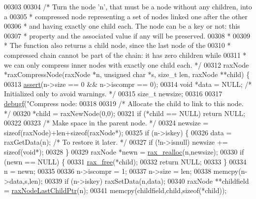 \begin{DoxyCode}
{00303 
00304 \textcolor{comment}{/* Turn the node 'n', that must be a node without any children, into a}
00305 \textcolor{comment}{ * compressed node representing a set of nodes linked one after the other}
00306 \textcolor{comment}{ * and having exactly one child each. The node can be a key or not: this}
00307 \textcolor{comment}{ * property and the associated value if any will be preserved.}
00308 \textcolor{comment}{ *}
00309 \textcolor{comment}{ * The function also returns a child node, since the last node of the}
00310 \textcolor{comment}{ * compressed chain cannot be part of the chain: it has zero children while}
00311 \textcolor{comment}{ * we can only compress inner nodes with exactly one child each. */}
00312 raxNode *raxCompressNode(raxNode *n, \textcolor{keywordtype}{unsigned} \textcolor{keywordtype}{char} *s, size\_t len, raxNode **child) \{
00313     \hyperlink{redisassert_8h_a993abaa2c168852c1592879472938781}{assert}(n->size == 0 && n->iscompr == 0);
00314     \textcolor{keywordtype}{void} *data = NULL; \textcolor{comment}{/* Initialized only to avoid warnings. */}
00315     size\_t newsize;
00316 
00317     \hyperlink{rax_8c_a10b215c81aa397dbc44adfb3e436befb}{debugf}(\textcolor{stringliteral}{"Compress node: %
00318 
00319     \textcolor{comment}{/* Allocate the child to link to this node. */}
00320     *child = raxNewNode(0,0);
00321     \textcolor{keywordflow}{if} (*child == NULL) \textcolor{keywordflow}{return} NULL;
00322 
00323     \textcolor{comment}{/* Make space in the parent node. */}
00324     newsize = \textcolor{keyword}{sizeof}(raxNode)+len+\textcolor{keyword}{sizeof}(raxNode*);
00325     \textcolor{keywordflow}{if} (n->iskey) \{
00326         data = raxGetData(n); \textcolor{comment}{/* To restore it later. */}
00327         \textcolor{keywordflow}{if} (!n->isnull) newsize += \textcolor{keyword}{sizeof}(\textcolor{keywordtype}{void}*);
00328     \}
00329     raxNode *newn = \hyperlink{rax__malloc_8h_a4aa041a0e1eaa6d8476e889547280467}{rax\_realloc}(n,newsize);
00330     \textcolor{keywordflow}{if} (newn == NULL) \{
00331         \hyperlink{rax__malloc_8h_a3adfa16bca6cd23b6e125fd441465e49}{rax\_free}(*child);
00332         \textcolor{keywordflow}{return} NULL;
00333     \}
00334     n = newn;
00335 
00336     n->iscompr = 1;
00337     n->size = len;
00338     memcpy(n->data,s,len);
00339     \textcolor{keywordflow}{if} (n->iskey) raxSetData(n,data);
00340     raxNode **childfield = \hyperlink{rax_8c_a2c5310b0d00672508a8f935a7109f4ce}{raxNodeLastChildPtr}(n);
00341     memcpy(childfield,child,\textcolor{keyword}{sizeof}(*child));
}}
\end{DoxyCode}
